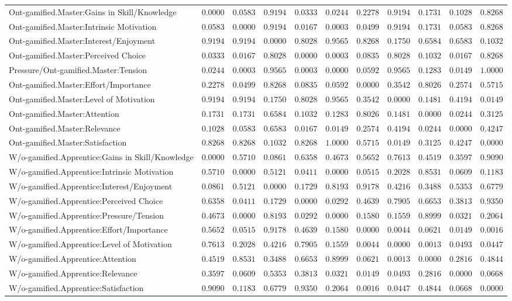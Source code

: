 \begin{landscape}
{\begin{longtable}{lrrrrrrrrrr}
Ont-gamified.Master:Gains in Skill/Knowledge&$0.0000$&$0.0583$&$0.9194$&$0.0333$&$0.0244$&$0.2278$&$0.9194$&$0.1731$&$0.1028$&$0.8268$\tabularnewline
Ont-gamified.Master:Intrinsic Motivation&$0.0583$&$0.0000$&$0.9194$&$0.0167$&$0.0003$&$0.0499$&$0.9194$&$0.1731$&$0.0583$&$0.8268$\tabularnewline
Ont-gamified.Master:Interest/Enjoyment&$0.9194$&$0.9194$&$0.0000$&$0.8028$&$0.9565$&$0.8268$&$0.1750$&$0.6584$&$0.6583$&$0.1032$\tabularnewline
Ont-gamified.Master:Perceived Choice&$0.0333$&$0.0167$&$0.8028$&$0.0000$&$0.0003$&$0.0835$&$0.8028$&$0.1032$&$0.0167$&$0.8268$\tabularnewline
Pressure/Ont-gamified.Master:Tension&$0.0244$&$0.0003$&$0.9565$&$0.0003$&$0.0000$&$0.0592$&$0.9565$&$0.1283$&$0.0149$&$1.0000$\tabularnewline
Ont-gamified.Master:Effort/Importance&$0.2278$&$0.0499$&$0.8268$&$0.0835$&$0.0592$&$0.0000$&$0.3542$&$0.8026$&$0.2574$&$0.5715$\tabularnewline
Ont-gamified.Master:Level of Motivation&$0.9194$&$0.9194$&$0.1750$&$0.8028$&$0.9565$&$0.3542$&$0.0000$&$0.1481$&$0.4194$&$0.0149$\tabularnewline
Ont-gamified.Master:Attention&$0.1731$&$0.1731$&$0.6584$&$0.1032$&$0.1283$&$0.8026$&$0.1481$&$0.0000$&$0.0244$&$0.3125$\tabularnewline
Ont-gamified.Master:Relevance&$0.1028$&$0.0583$&$0.6583$&$0.0167$&$0.0149$&$0.2574$&$0.4194$&$0.0244$&$0.0000$&$0.4247$\tabularnewline
Ont-gamified.Master:Satisfaction&$0.8268$&$0.8268$&$0.1032$&$0.8268$&$1.0000$&$0.5715$&$0.0149$&$0.3125$&$0.4247$&$0.0000$\tabularnewline
\hline



W/o-gamified.Apprentice:Gains in Skill/Knowledge&$0.0000$&$0.5710$&$0.0861$&$0.6358$&$0.4673$&$0.5652$&$0.7613$&$0.4519$&$0.3597$&$0.9090$\tabularnewline
W/o-gamified.Apprentice:Intrinsic Motivation&$0.5710$&$0.0000$&$0.5121$&$0.0411$&$0.0000$&$0.0515$&$0.2028$&$0.8531$&$0.0609$&$0.1183$\tabularnewline
W/o-gamified.Apprentice:Interest/Enjoyment&$0.0861$&$0.5121$&$0.0000$&$0.1729$&$0.8193$&$0.9178$&$0.4216$&$0.3488$&$0.5353$&$0.6779$\tabularnewline
W/o-gamified.Apprentice:Perceived Choice&$0.6358$&$0.0411$&$0.1729$&$0.0000$&$0.0292$&$0.4639$&$0.7905$&$0.6653$&$0.3813$&$0.9350$\tabularnewline
W/o-gamified.Apprentice:Pressure/Tension&$0.4673$&$0.0000$&$0.8193$&$0.0292$&$0.0000$&$0.1580$&$0.1559$&$0.8999$&$0.0321$&$0.2064$\tabularnewline
W/o-gamified.Apprentice:Effort/Importance&$0.5652$&$0.0515$&$0.9178$&$0.4639$&$0.1580$&$0.0000$&$0.0044$&$0.0621$&$0.0149$&$0.0016$\tabularnewline
W/o-gamified.Apprentice:Level of Motivation&$0.7613$&$0.2028$&$0.4216$&$0.7905$&$0.1559$&$0.0044$&$0.0000$&$0.0013$&$0.0493$&$0.0447$\tabularnewline
W/o-gamified.Apprentice:Attention&$0.4519$&$0.8531$&$0.3488$&$0.6653$&$0.8999$&$0.0621$&$0.0013$&$0.0000$&$0.2816$&$0.4844$\tabularnewline
W/o-gamified.Apprentice:Relevance&$0.3597$&$0.0609$&$0.5353$&$0.3813$&$0.0321$&$0.0149$&$0.0493$&$0.2816$&$0.0000$&$0.0668$\tabularnewline
W/o-gamified.Apprentice:Satisfaction&$0.9090$&$0.1183$&$0.6779$&$0.9350$&$0.2064$&$0.0016$&$0.0447$&$0.4844$&$0.0668$&$0.0000$\tabularnewline
\hline



\end{longtable}}
\end{landscape}
